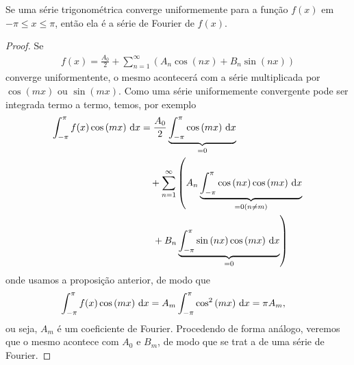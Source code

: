 \begin{teo}
    Se uma s\'{e}rie trigonom\'{e}trica converge uniformemente para a fun\c{c}\~{a}o $f(x)$ em $-\pi \leq x \leq \pi$, ent\~{a}o ela \'{e} a s\'{e}rie de Fourier de $f(x)$.
\end{teo}
\begin{proof}
    Se
    \begin{align*}
        f(x) = \frac{A_0}{2} + \sum_{n = 1}^\infty \left( A_n \cos\left( n x \right) + B_n \sin\left( n x \right) \right)
    \end{align*}
    converge uniformentente, o mesmo acontecer\'{a} com a s\'{e}rie multiplicada por $\cos\left( m x \right)$ ou $\sin\left( m x \right)$. Como uma s\'{e}rie uniformemente convergente pode ser integrada termo a termo, temos, por exemplo
    \begin{align*}
        \begin{split}
            \int_{-\pi}^\pi f(x) \cos\left( m x \right) \, \mathrm{d}x &= \frac{A_0}{2} \underbrace{\int_{-\pi}^\pi \cos\left( m x \right) \, \mathrm{d}x}_{= 0} \\
            &\quad {}+ \sum_{n = 1}^\infty \left( A_n \underbrace{\int_{-\pi}^\pi \cos\left( n x \right) \cos\left( m x \right) \, \mathrm{d}x}_{= 0 (n \neq m)} \right. \\
            &\quad \left. {}+ B_n \underbrace{\int_{-\pi}^\pi \sin\left( n x \right) \cos\left( m x \right) \, \mathrm{d}x}_{= 0} \right)
        \end{split}
    \end{align*}
    onde usamos a proposi\c{c}\~{a}o anterior, de modo que
    \begin{align*}
        \int_{-\pi}^\pi f(x) \cos\left( m x \right) \, \mathrm{d}x &= A_m \int_{-\pi}^\pi \cos^2\left( m x \right) \, \mathrm{d}x = \pi A_m,
    \end{align*}
    ou seja, $A_m$ \'{e} um coeficiente de Fourier. Procedendo de forma an\'{a}logo, veremos que o mesmo acontece com $A_0$ e $B_m$, de modo que se trat a de uma s\'{e}rie de Fourier.
\end{proof}

